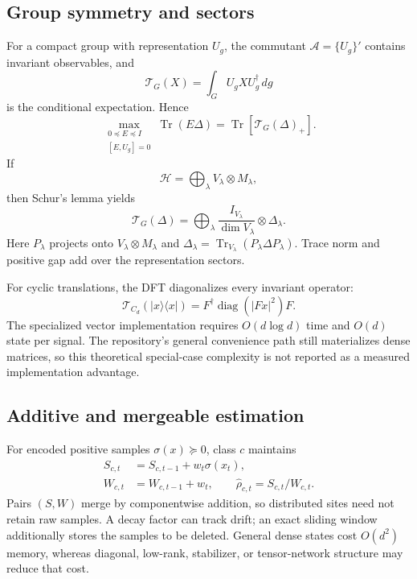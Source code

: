 \documentclass[letterpaper,journal]{IEEEtran}
\newcommand{\Tr}{\operatorname{Tr}}
\newcommand{\A}{\mathcal A}
\newcommand{\T}{\mathcal T}
\begin{document}
\subsection{Group symmetry and sectors}

For a compact group with representation $U_g$, the commutant
$\A=\{U_g\}'$ contains invariant observables, and
\begin{equation}
\T_G(X)=\int_G U_g XU_g^\dagger\,dg
\label{eq:twirl}
\end{equation}
is the conditional expectation. Hence
\begin{equation}
\max_{\substack{0\preceq E\preceq I\\{}[E,U_g]=0}}
\Tr(E\Delta)=\Tr[\T_G(\Delta)_+].
\label{eq:symopt}
\end{equation}
If
\begin{equation}
\mathcal H=\bigoplus_\lambda V_\lambda\otimes M_\lambda,
\end{equation}
then Schur's lemma yields
\begin{equation}
\T_G(\Delta)=\bigoplus_\lambda
\frac{I_{V_\lambda}}{\dim V_\lambda}\otimes\Delta_\lambda.
\label{eq:block}
\end{equation}
Here $P_\lambda$ projects onto $V_\lambda\otimes M_\lambda$ and
$\Delta_\lambda=\Tr_{V_\lambda}(P_\lambda\Delta P_\lambda)$.
Trace norm and positive gap add over the representation sectors.

For cyclic translations, the DFT diagonalizes every invariant operator:
\begin{equation}
\T_{C_d}(|x\rangle\langle x|)
=F^\dagger\operatorname{diag}(|Fx|^2)F.
\label{eq:power}
\end{equation}
The specialized vector implementation requires $O(d\log d)$ time and $O(d)$
state per signal. The repository's general convenience path still
materializes dense matrices, so this theoretical special-case complexity is
not reported as a measured implementation advantage.

\subsection{Additive and mergeable estimation}

For encoded positive samples $\sigma(x)\succeq0$, class $c$ maintains
\begin{equation}
\begin{aligned}
S_{c,t}&=S_{c,t-1}+w_t\sigma(x_t),\\
W_{c,t}&=W_{c,t-1}+w_t,\qquad
\widehat\rho_{c,t}=S_{c,t}/W_{c,t}.
\end{aligned}
\label{eq:additive}
\end{equation}
Pairs $(S,W)$ merge by componentwise addition, so distributed sites need not
retain raw samples. A decay factor can track drift; an exact sliding window
additionally stores the samples to be deleted. General dense states cost
$O(d^2)$ memory, whereas diagonal, low-rank, stabilizer, or tensor-network
structure may reduce that cost.
\end{document}
